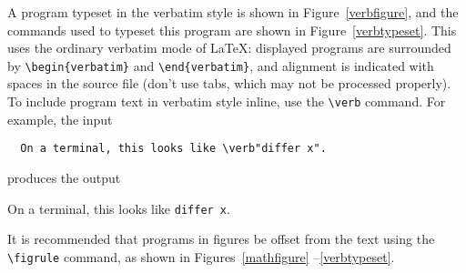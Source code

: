 \documentclass{jfp1}
\begin{document}
A program typeset in the verbatim style is shown in
Figure~\ref{verbfigure}, and the commands used to typeset this program
are shown in Figure~\ref{verbtypeset}.  This uses the ordinary
verbatim mode of \LaTeX: displayed programs are surrounded by
\verb|\begin{verbatim}| and \verb|\end{verbatim}|, and alignment is
indicated with spaces in the source file (don't use tabs, which may
not be processed properly).  To include program
text in verbatim style inline, use the \verb|\verb| command.
For example, the input
\begin{center}
\begin{verbatim}
  On a terminal, this looks like \verb"differ x".
\end{verbatim}
\end{center}
produces the output
\begin{center}
  On a terminal, this looks like \verb"differ x".
\end{center}

It is recommended that programs in figures be offset from the text
using the \verb|\figrule| command, as shown in Figures~\ref{mathfigure}%
--\ref{verbtypeset}.
\end{document}
